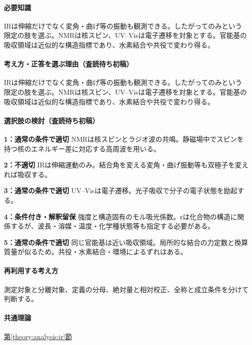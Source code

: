 \paragraph{必要知識} IRは伸縮だけでなく変角・曲げ等の振動も観測できる。したがってのみという限定の肢を選ぶ。NMRは核スピン、UV–Visは電子遷移を対象とする。官能基の吸収領域は近似的な構造指標であり、水素結合や共役で変わり得る。

\paragraph{考え方・正答を選ぶ理由（査読待ち初稿）} IRは伸縮だけでなく変角・曲げ等の振動も観測できる。したがってのみという限定の肢を選ぶ。NMRは核スピン、UV–Visは電子遷移を対象とする。官能基の吸収領域は近似的な構造指標であり、水素結合や共役で変わり得る。

\paragraph{選択肢の検討（査読待ち初稿）}\mbox{}\par

\noindent\textbf{1：通常の条件で適切} NMRは核スピンとラジオ波の共鳴。静磁場中でスピンを持つ核のエネルギー差に対応する高周波を用いる。\par

\noindent\textbf{2：不適切} IRは伸縮運動のみ。結合角を変える変角・曲げ振動等も双極子を変えれば吸収する。\par

\noindent\textbf{3：通常の条件で適切} UV–Visは電子遷移。光子吸収で分子の電子状態を励起する。\par

\noindent\textbf{4：条件付き・解釈留保} 強度と構造固有のモル吸光係数。εは化合物の構造に関係するが、波長・溶媒・温度・化学種状態等も指定する必要がある。\par

\noindent\textbf{5：通常の条件で適切} 同じ官能基は近い吸収領域。局所的な結合の力定数と換算質量が似るため。共役・水素結合・環境によるずれはある。\par

\paragraph{再利用する考え方} 測定対象と分離対象、定義の分母、絶対量と相対校正、全称と成立条件を分けて判断する。

\paragraph{共通理論} \hyperref[theory:analysis:ir]{第\ref*{theory:analysis:ir}節}

